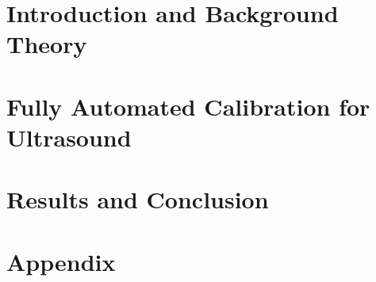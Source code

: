 
\addtolength{\evensidemargin}{-12mm}

%
%
\part[Introduction and Background Theory]{Introduction and Background Theory}
\label{part:introAndBackgroundTheory}

 

%
\part[Fully Automated Calibration for Ultrasound]{Fully Automated Calibration for Ultrasound}
\label{part:fullyAutomatedCalibration}
 

 
 

\part[Results and Conclusion]{Results and Conclusion}
\label{part:resultsAndConclusion}
 
 
 


%
%

\part*{Appendix}

\appendix %


